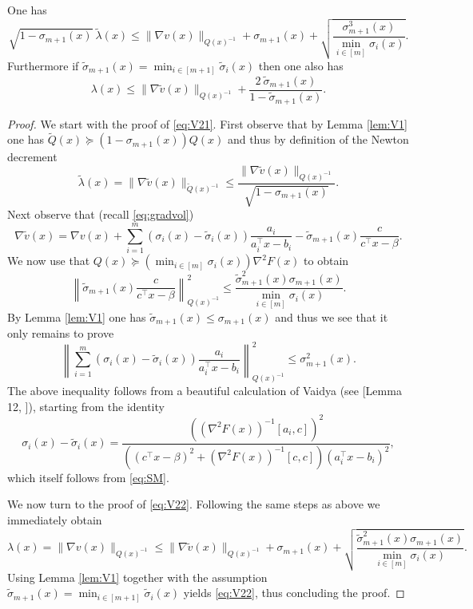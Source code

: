 \documentclass[openany]{now}
\renewcommand{\tilde}{\widetilde}
\begin{document}
\begin{lemma} \label{lem:V2}
One has
\begin{equation} \label{eq:V21}
\sqrt{1- \sigma_{m+1}(x)} \ \tilde{\lambda} (x) \leq \|\nabla {v}(x)\|_{Q(x)^{-1}} + \sigma_{m+1}(x) + \sqrt{\frac{\sigma_{m+1}^3(x)}{\min_{i \in [m]} \sigma_i(x)}} .
\end{equation}
Furthermore if $\tilde{\sigma}_{m+1}(x) = \min_{i \in [m+1]} \tilde{\sigma}_{i}(x)$ then one also has
\begin{equation} \label{eq:V22}
\lambda(x) \leq  \|\nabla \tilde{v}(x)\|_{Q(x)^{-1}} + \frac{2 \ \tilde{\sigma}_{m+1}(x)}{1 - \tilde{\sigma}_{m+1}(x)} .
\end{equation}
\end{lemma}

\begin{proof}
We start with the proof of \eqref{eq:V21}. First observe that by Lemma \ref{lem:V1} one has $\tilde{Q}(x) \succeq (1-\sigma_{m+1}(x)) Q(x)$ and thus by definition of the Newton decrement
$$\tilde{\lambda} (x) = \|\nabla \tilde{v}(x)\|_{\tilde{Q}(x)^{-1}} \leq \frac{\|\nabla \tilde{v}(x)\|_{Q(x)^{-1}}}{\sqrt{1-\sigma_{m+1}(x)}} .$$
Next observe that (recall \eqref{eq:gradvol})
$$ \nabla \tilde{v}(x) = \nabla v(x) + \sum_{i=1}^m ({\sigma}_i(x) - \tilde{\sigma}_i(x)) \frac{a_i}{a_i^{\top} x - b_i} - \tilde{\sigma}_{m+1}(x) \frac{c}{c^{\top} x - \beta} .$$
We now use that $Q(x) \succeq (\min_{i \in [m]} \sigma_i(x)) \nabla^2 F(x)$ to obtain 
$$\left \| \tilde{\sigma}_{m+1}(x) \frac{c}{c^{\top} x - \beta} \right\|_{Q(x)^{-1}}^2 \leq \frac{\tilde{\sigma}_{m+1}^2(x) \sigma_{m+1}(x)}{\min_{i \in [m]} \sigma_i(x)} .$$
By Lemma \ref{lem:V1} one has $\tilde{\sigma}_{m+1}(x) \leq {\sigma}_{m+1}(x)$ and thus we see that it only remains to prove 
$$\left\|\sum_{i=1}^m ({\sigma}_i(x) - \tilde{\sigma}_i(x)) \frac{a_i}{a_i^{\top}x - b_i} \right\|_{Q(x)^{-1}}^2 \leq \sigma_{m+1}^2(x) .$$
The above inequality follows from a beautiful calculation of Vaidya (see [Lemma 12, \cite{Vai96}]), starting from the identity
$$\sigma_i(x) - \tilde{\sigma}_i(x) = \frac{((\nabla^2 F(x))^{-1}[a_i,c])^2}{((c^{\top} x - \beta)^2 + (\nabla^2 F(x))^{-1}[c,c])(a_i^{\top} x - b_i)^2} ,$$
which itself follows from \eqref{eq:SM}.
\newline

We now turn to the proof of \eqref{eq:V22}. Following the same steps as above we immediately obtain
$$\lambda(x) = \|\nabla v(x)\|_{Q(x)^{-1}} \leq \|\nabla \tilde{v}(x)\|_{Q(x)^{-1}} + \sigma_{m+1}(x) + \sqrt{\frac{\tilde{\sigma}_{m+1}^2(x) \sigma_{m+1}(x)}{\min_{i \in [m]} \sigma_i(x)}} .$$
Using Lemma \ref{lem:V1} together with the assumption $\tilde{\sigma}_{m+1}(x) = \min_{i \in [m+1]} \tilde{\sigma}_{i}(x)$ yields \eqref{eq:V22}, thus concluding the proof.
\end{proof}
\end{document}
